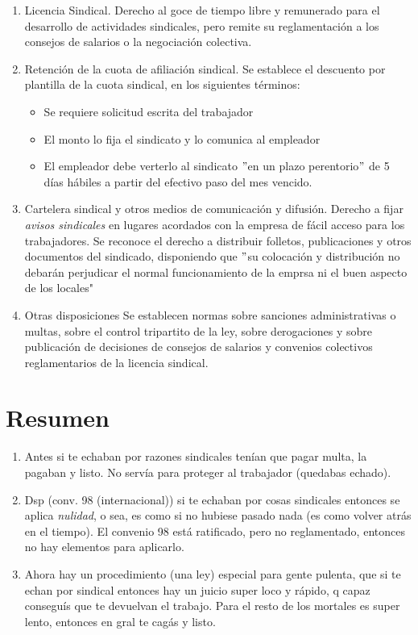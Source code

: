 \documentclass[spanish,12pt,a4paper,titlepage]{report}
\begin{document}
\begin{enumerate}
\item Licencia Sindical. Derecho al goce de tiempo libre y remunerado para el desarrollo de actividades sindicales, pero remite su reglamentación a los consejos de salarios o la negociación colectiva.

\item Retención de la cuota de afiliación sindical. Se establece el descuento por plantilla de la cuota sindical, en los siguientes términos:
	\begin{itemize}
	\item Se requiere solicitud escrita del trabajador
	\item El monto lo fija el sindicato y lo comunica al empleador
	\item El empleador debe verterlo al sindicato $"$en un plazo perentorio$"$ de 5 días hábiles a partir del efectivo paso del mes vencido. 
	\end{itemize}
\item Cartelera sindical y otros medios de comunicación y difusión. Derecho a fijar \textit{avisos sindicales} en lugares acordados con la empresa de fácil acceso para los trabajadores. Se reconoce el derecho a distribuir folletos, publicaciones y otros documentos del sindicado, disponiendo que $"$su colocación y distribución no debarán perjudicar el normal funcionamiento de la emprsa ni el buen aspecto de los locales"

\item Otras disposiciones
Se establecen normas sobre sanciones administrativas o multas, sobre el control tripartito de la ley, sobre derogaciones y sobre publicación de decisiones de consejos de salarios y convenios colectivos reglamentarios de la licencia sindical.
\end{enumerate}

\section{Resumen}
\label{sec:15-res}
\begin{enumerate}
\item Antes si te echaban por razones sindicales tenían que pagar multa, la pagaban y listo. No servía para proteger al trabajador (quedabas echado).
\item Dsp (conv. 98 (internacional)) si te echaban por cosas sindicales entonces se aplica \textit{nulidad}, o sea, es como si no hubiese pasado nada (es como volver atrás en el tiempo). El convenio 98 está ratificado, pero no reglamentado, entonces no hay elementos para aplicarlo.
\item Ahora hay un procedimiento (una ley) especial para gente pulenta, que si te echan por sindical entonces hay un juicio super loco y rápido, q capaz conseguís que te devuelvan el trabajo. Para el resto de los mortales es super lento, entonces en gral te cagás y listo.
\end{enumerate}
\end{document}
